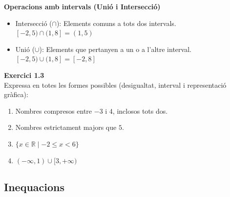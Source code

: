 \documentclass[12pt]{article}
\begin{document}
\begin{exemple}
\textbf{Operacions amb intervals (Unió i Intersecció)}
\begin{itemize}
    \item Intersecció ($\cap$): Elements comuns a tots dos intervals. \\
    $[ -2, 5 ) \cap ( 1, 8 ] = ( 1, 5 )$
    \item Unió ($\cup$): Elements que pertanyen a un o a l'altre interval. \\
    $[ -2, 5 ) \cup ( 1, 8 ] = [ -2, 8 ]$
\end{itemize}
\end{exemple}

\begin{exercici}
\textbf{Exercici 1.3}\\
Expressa en totes les formes possibles (desigualtat, interval i representació gràfica):
\begin{enumerate}[label=\alph*)]
    \item Nombres compresos entre $-3$ i $4$, inclosos tots dos.
    \item Nombres estrictament majors que $5$.
    \item $\{x \in \mathbb{R} \mid -2 \le x < 6\}$
    \item $(-\infty, 1) \cup [3, +\infty)$
\end{enumerate}
\end{exercici}

\subsection{Inequacions}
\end{document}

